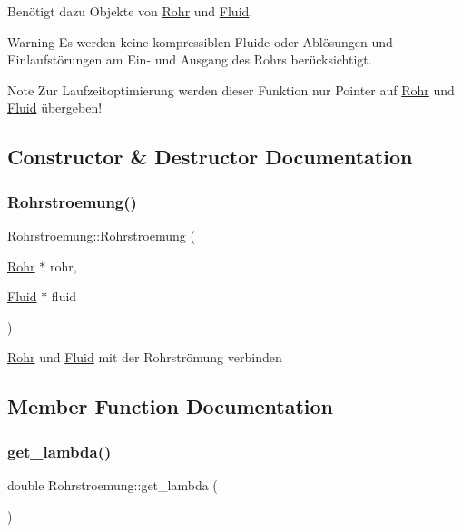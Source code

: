 Benötigt dazu Objekte von \hyperlink{class_rohr}{Rohr} und \hyperlink{class_fluid}{Fluid}.

\begin{DoxyWarning}{Warning}
Es werden keine kompressiblen Fluide oder Ablösungen und Einlaufstörungen am Ein-\/ und Ausgang des Rohrs berücksichtigt.
\end{DoxyWarning}
\begin{DoxyNote}{Note}
Zur Laufzeitoptimierung werden dieser Funktion nur Pointer auf \hyperlink{class_rohr}{Rohr} und \hyperlink{class_fluid}{Fluid} übergeben! 
\end{DoxyNote}


\subsection{Constructor \& Destructor Documentation}
\mbox{\label{class_rohrstroemung_aa8ee146566f18b2a4ca4cbfc1946c2b8}} 
\subsubsection{\texorpdfstring{Rohrstroemung()}{Rohrstroemung()}}
{\footnotesize\ttfamily Rohrstroemung\+::\+Rohrstroemung (\begin{DoxyParamCaption}\item[{\hyperlink{class_rohr}{Rohr} $\ast$}]{rohr,  }\item[{\hyperlink{class_fluid}{Fluid} $\ast$}]{fluid }\end{DoxyParamCaption})}

\hyperlink{class_rohr}{Rohr} und \hyperlink{class_fluid}{Fluid} mit der Rohrströmung verbinden 

\subsection{Member Function Documentation}
\mbox{\label{class_rohrstroemung_a7ea25aca94625ef68bf856d957419d26}} 
\subsubsection{\texorpdfstring{get\+\_\+lambda()}{get\_lambda()}}
{\footnotesize\ttfamily double Rohrstroemung\+::get\+\_\+lambda (\begin{DoxyParamCaption}{ }\end{DoxyParamCaption})}



